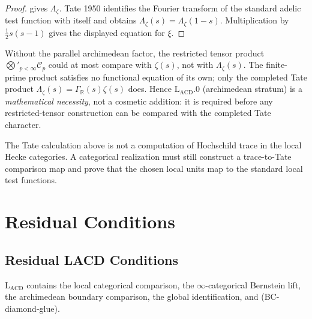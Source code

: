 \begin{proof}
 gives
\(\Lambda_{\zeta}\). Tate 1950 identifies the Fourier transform of the
standard adelic test function with itself and obtains
\(\Lambda_{\zeta}(s)=\Lambda_{\zeta}(1-s)\). Multiplication by
\(\tfrac12 s(s-1)\) gives the displayed equation for \(\xi\).
\end{proof}

\begin{remark}
\label{v4-arith:lacd:rem:arch-significance}
Without the parallel archimedean factor, the restricted tensor
product \(\bigotimes'_{p<\infty}\mathcal{C}_{p}\) could at most
compare with \(\zeta(s)\), not with \(\Lambda_{\zeta}(s)\). The
finite-prime product satisfies no functional equation of its own; only the
completed Tate product
\(\Lambda_{\zeta}(s) = \Gamma_{\mathbb{R}}(s)\zeta(s)\) does.
Hence \(\mathrm{L}_{\mathrm{ACD}}.0\) (archimedean stratum) is a
\emph{mathematical necessity}, not a cosmetic addition: it is
required before any restricted-tensor construction can be compared
with the completed Tate character.
\end{remark}

\begin{remark}
\label{v4-arith:lacd:rem:trace-comparison-extra}
The Tate calculation above is not a computation of Hochschild trace in
the local Hecke categories. A categorical realization must still
construct a trace-to-Tate comparison map and prove that the chosen
local units map to the standard local test functions.
\end{remark}

\section{Residual Conditions}
\label{v4-arith:lacd:residual}

\subsection{Residual LACD Conditions}

\(\mathrm{L}_{\mathrm{ACD}}\) contains the local categorical comparison, the
\(\infty\)-categorical Bernstein lift, the archimedean boundary
comparison, the global identification, and (BC-diamond-glue).

